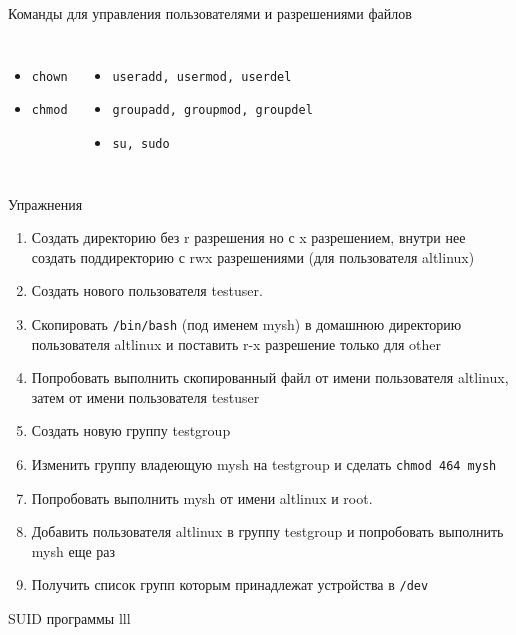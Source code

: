 \documentclass[ignorenonframetext, professionalfonts, hyperref={pdftex, unicode}]{beamer}
\begin{document}
\begin{frame}{Команды для управления пользователями и разрешениями файлов}
\begin{columns}
 \begin{itemize}
   \item {\tt chown}
   \item {\tt chmod}
 \end{itemize}
 \begin{itemize}
   \item {\tt useradd, usermod, userdel}
   \item {\tt groupadd, groupmod, groupdel}
   \item {\tt su, sudo}
 \end{itemize}
\end{columns}
\begin{block}{Упражнения}
  \begin{enumerate}
   \item Создать директорию без r разрешения но с x разрешением, внутри нее создать поддиректорию с rwx разрешениями (для пользователя altlinux)
   \item Создать нового пользователя testuser.
   \item Скопировать {\tt /bin/bash} (под именем mysh) в домашнюю директорию пользователя altlinux  и поставить r-x разрешение только для other
   \item Попробовать выполнить скопированный файл от имени пользователя altlinux, затем от имени пользователя testuser
   \item Создать новую группу testgroup
   \item Изменить группу владеющую mysh на testgroup и сделать {\tt chmod 464 mysh}
   \item Попробовать выполнить mysh от имени altlinux и root. 
   \item Добавить пользователя altlinux в группу testgroup и попробовать выполнить mysh еще раз
   \item Получить список групп которым принадлежат устройства в {\tt /dev}
  \end{enumerate}
\end{block}
\end{frame}

\begin{frame}{SUID программы}
  lll
\end{frame}
\end{document}
